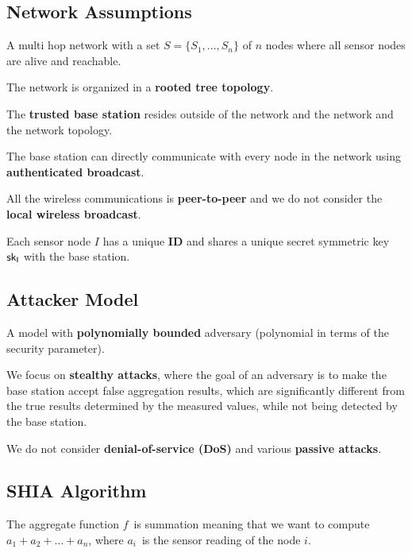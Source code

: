\documentclass[%
  slidesonly,%
  semlayer%
  ]{seminar}                                  %
\begin{document}
\begin{slide}
    \subsection*{Network Assumptions}
      A multi hop network with a set $ S = \{S_{1},...,S_{n}\} $ of $n$ nodes where all sensor nodes are alive and reachable. 

      The network is organized in a \textbf{rooted tree topology}.

      The \textbf{trusted base station} resides outside of the network and the network and the network topology. 

      The base station can directly communicate with every node in the network using \textbf{authenticated broadcast}.

      All the wireless communications is \textbf{peer-to-peer} and we do not consider the \textbf{local wireless broadcast}.

      Each sensor node $I$ has a unique \textbf{ID} and shares a unique secret symmetric key $\sf{sk}_{I}$ with the base station.

      \vfill
      \clearpage

    \subsection*{Attacker Model}
      \vspace{0.3in}
      A model with \textbf{polynomially bounded} adversary (polynomial in terms of the security parameter).
      \vspace{0.3in}
   
      We focus on \textbf{stealthy attacks}, where the goal of an adversary is to make the base station accept false aggregation  results, which are significantly different from the true results determined by the measured values, while not being detected by the base station.
      \vspace{0.3in}
      
      We do not consider \textbf{denial-of-service (DoS)} and various \textbf{passive attacks}.
      \vfill
      \clearpage

    \subsection*{SHIA Algorithm}
      \vspace{0.3in}
      The aggregate function $f$\ is summation meaning that we want to compute $a_{1} + a_{2} + \dotsc + a_{n}$, where $a_{i}$\ is the sensor reading of the node $i$.
      \vspace{0.3in}
 

\end{slide}
\end{document}
